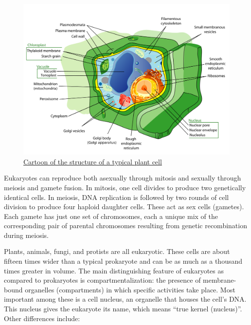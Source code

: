 \begin{figure}

{\centering \includegraphics[width=0.7\linewidth]{./figures/cells/Plant_cell_structure-en} 

}

\caption{\href{https://commons.wikimedia.org/wiki/File:Plant_cell_structure_en.svg}{Cartoon of the structure of a typical plant cell}}\label{fig:typicalplantcell}
\end{figure}

Eukaryotes can reproduce both asexually through mitosis and sexually through meiosis and gamete fusion. In mitosis, one cell divides to produce two genetically identical cells. In meiosis, DNA replication is followed by two rounds of cell division to produce four haploid daughter cells. These act as sex cells (gametes). Each gamete has just one set of chromosomes, each a unique mix of the corresponding pair of parental chromosomes resulting from genetic recombination during meiosis.

Plants, animals, fungi, and protists are all eukaryotic. These cells are about fifteen times wider than a typical prokaryote and can be as much as a thousand times greater in volume. The main distinguishing feature of eukaryotes as compared to prokaryotes is compartmentalization: the presence of membrane-bound organelles (compartments) in which specific activities take place. Most important among these is a cell nucleus, an organelle that houses the cell's DNA. This nucleus gives the eukaryote its name, which means ``true kernel (nucleus)''. Other differences include:

